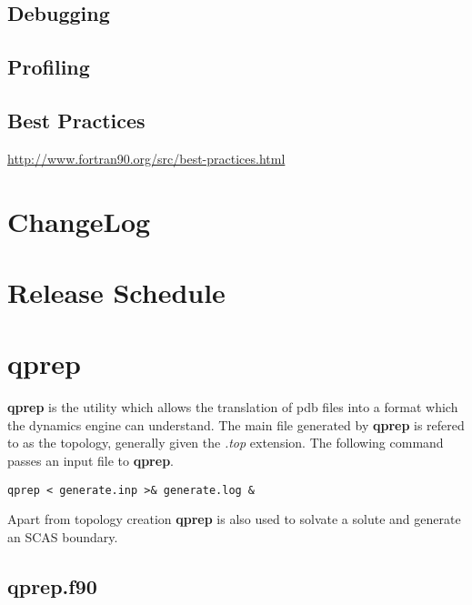 \documentclass[10pt, oneside, pdftex]{article}
\begin{document}
\subsection{Debugging}
\label{debugging}


\subsection{Profiling}
\label{profiling}

\subsection{Best Practices}
\label{bestpractices}

\url{http://www.fortran90.org/src/best-practices.html}


\section{ChangeLog}
\label{changelog}


\section{Release Schedule}
\label{schedule}


\section{qprep}
\label{qprep}
\textbf{qprep}  is the  utility which  allows the  translation of  pdb
files into a format which the dynamics engine can understand. The main
file  generated  by \textbf{qprep}  is  refered  to as  the  topology,
generally  given the  \textit{.top} extension.  The following  command
passes an input file to \textbf{qprep}.

\lstset{language=sh, frame=single}
\begin{Verbatim}
qprep < generate.inp >& generate.log &
\end{Verbatim}

Apart from topology creation \textbf{qprep} is also used to solvate a
solute and generate an SCAS boundary.



\subsection{qprep.f90}
\end{document}
